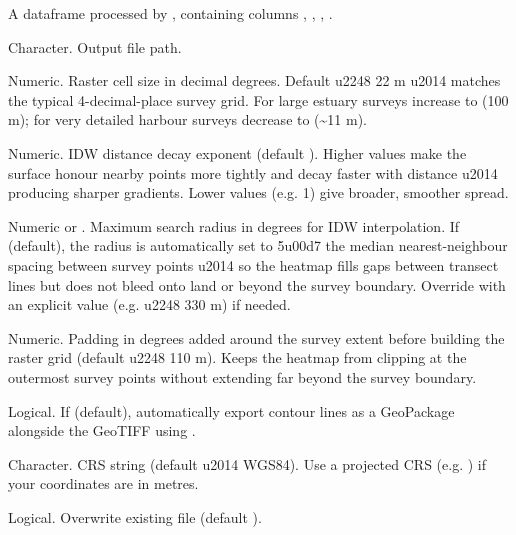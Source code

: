 \documentclass[a4paper]{book}
\begin{document}
\begin{Arguments}
\begin{ldescription}
\item[\code{df}] A dataframe processed by , containing columns
, , , .

\item[\code{path}] Character. Output  file path.

\item[\code{resolution}] Numeric. Raster cell size in decimal degrees. Default
 \bsl{}u2248 22 m \bsl{}u2014 matches the typical 4-decimal-place survey grid. For
large estuary surveys increase to  (100 m); for very detailed
harbour surveys decrease to  (\textasciitilde{}11 m).

\item[\code{idw\_power}] Numeric. IDW distance decay exponent (default ). Higher
values make the surface honour nearby points more tightly and decay faster
with distance \bsl{}u2014 producing sharper gradients. Lower values (e.g. 1) give
broader, smoother spread.

\item[\code{idw\_max\_dist}] Numeric or . Maximum search radius in degrees for
IDW interpolation. If  (default), the radius is automatically set to
5\bsl{}u00d7 the median nearest-neighbour spacing between survey points \bsl{}u2014 so the
heatmap fills gaps between transect lines but does not bleed onto land or
beyond the survey boundary. Override with an explicit value (e.g. 
\bsl{}u2248 330 m) if needed.

\item[\code{buffer}] Numeric. Padding in degrees added around the survey extent
before building the raster grid (default  \bsl{}u2248 110 m). Keeps the
heatmap from clipping at the outermost survey points without extending far
beyond the survey boundary.

\item[\code{contours}] Logical. If  (default), automatically export contour
lines as a GeoPackage alongside the GeoTIFF using .

\item[\code{crs}] Character. CRS string (default  \bsl{}u2014 WGS84). Use a
projected CRS (e.g. ) if your coordinates are in metres.

\item[\code{overwrite}] Logical. Overwrite existing file (default ).
\end{ldescription}
\end{Arguments}
\end{document}
